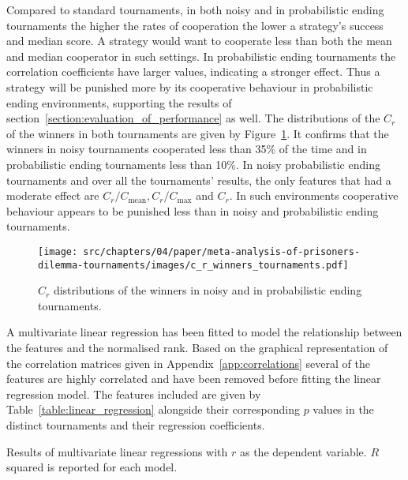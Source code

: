 Compared to standard tournaments, in both noisy and in probabilistic ending
tournaments the higher the rates of cooperation the lower a strategy's success
and median score. A strategy would want to cooperate less than both
the mean and median cooperator in such settings. In probabilistic ending
tournaments the correlation coefficients have larger values, indicating a
stronger effect. Thus a strategy will be punished more by its cooperative
behaviour in probabilistic ending environments, supporting the results of
section~\ref{section:evaluation_of_performance}
as well. The distributions of the $C_r$ of the winners in
both tournaments are given by Figure~\ref{fig:c_r_distributions}. It confirms
that the winners in noisy tournaments cooperated less than 35\% of the time
and in probabilistic ending tournaments less than 10\%.
In noisy probabilistic ending tournaments and over all the tournaments' results,
the only features that had a moderate effect are $C_r/C_{\text{mean}},
C_r/C_{\text{max}}$ and $C_r$. In such environments cooperative behaviour
appears to be punished less than in noisy and probabilistic ending
tournaments.

\begin{figure}[!htbp]
    \centering
    \texttt{[image: src/chapters/04/paper/meta-analysis-of-prisoners-dilemma-tournaments/images/c\_r\_winners\_tournaments.pdf]}
    \caption{$C_r$ distributions of the winners in noisy and in probabilistic
    ending tournaments.}\label{fig:c_r_distributions}
\end{figure}

A multivariate linear regression has been fitted to model the relationship between
the features and the normalised rank. Based on the graphical representation of
the correlation matrices given in Appendix~\ref{app:correlations} several of the
features are highly correlated and have been removed
before fitting the linear regression model. The features included are given
by Table~\ref{table:linear_regression} alongside their corresponding \(p\) values
in the distinct tournaments and their regression coefficients.

\begin{table}[h]
    \begin{center}
\resizebox{\textwidth}{!}{
    }
    \end{center}
    \caption{Results of multivariate linear regressions with \(r\) as the dependent variable.
    \(R\) squared is reported for each model.}
    \label{table:linear_regression}
\end{table}

